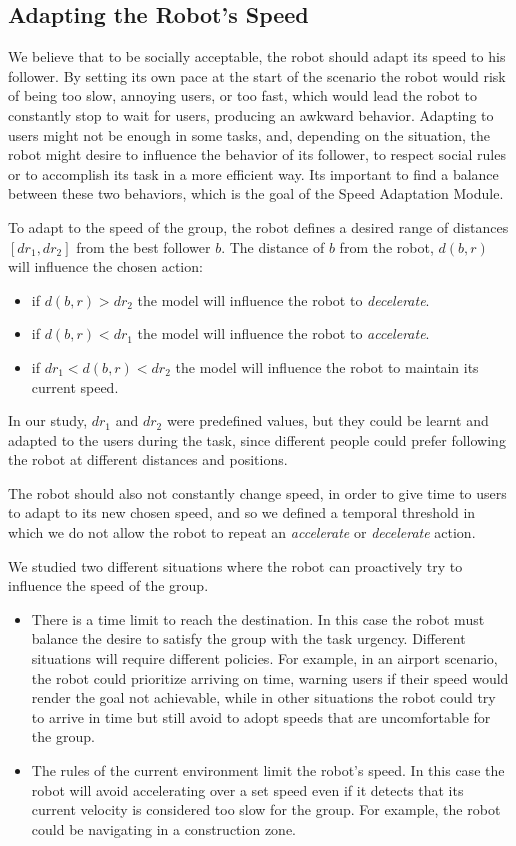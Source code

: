 \subsection{Adapting the Robot's Speed}
We believe that to be socially acceptable, the robot should adapt its speed to his follower. By setting its own pace at the start of the scenario the robot  would risk of being too slow, annoying users, or too fast, which would lead the robot to constantly stop to wait for users, producing an awkward behavior. Adapting to users might not be enough in some tasks, and, depending on the situation, the robot might desire to influence the behavior of its follower, to respect social rules or to accomplish its task in a more efficient way. Its important to find a balance between these two behaviors, which is the goal of the Speed Adaptation Module. 

To adapt to the speed of the group, the robot defines a desired range of distances $[dr_1,dr_2]$ from the best follower $b$. The distance of $b$ from the robot, $d(b,r)$ will influence the chosen action:
\begin{itemize}
\item if $d(b,r)>dr_2$  the model will influence the robot to \textit{decelerate}.
\item if $d(b,r)<dr_1$ the model will influence the robot to \textit{accelerate}.
\item if $dr_1<d(b,r)<dr_2$ the model will influence the robot to maintain its current speed.
\end{itemize} 

In our study, $dr_1$ and $dr_2$ were predefined values, but they could be learnt and adapted to the users during the task, since different people could prefer following the robot at different distances and positions.

The robot should also not constantly change speed, in order to give time to users to adapt to its new chosen speed, and so we defined a temporal threshold in which we do not allow the robot to repeat an \textit{accelerate} or \textit{decelerate} action.

We studied two different situations where the robot can proactively try to influence the speed of the group.
\begin{itemize}
\item There is a time limit to reach the destination. In this case the robot must balance the desire to satisfy the group with the task urgency. Different situations will require different policies. For example, in an airport scenario, the robot could prioritize arriving on time, warning users if their speed would render the goal not achievable, while in other situations the robot could try to arrive in time but still avoid to adopt speeds that are uncomfortable for the group.
\item The rules of the current environment limit the robot's speed. In this case the robot will avoid accelerating over a set speed even if it detects that its current velocity is considered too slow for the group. For example, the robot could be navigating in a construction zone.
\end{itemize}

